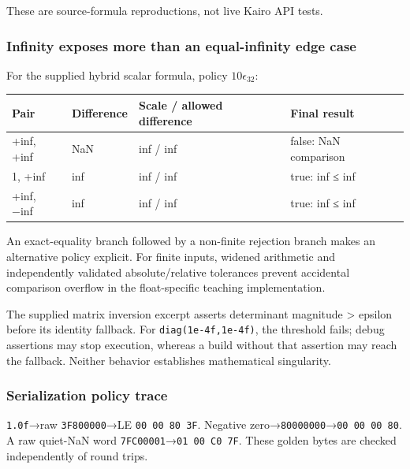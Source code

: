 These are source-formula reproductions, not live Kairo API tests.

\subsubsection{Infinity exposes more than an equal-infinity edge case}\label{appendix-92ff77d4dfdc-infinity-exposes-more-than-an-equal-infinity-edge-case}

\hypertarget{appendix-92ff77d4dfdc-infinity-exposes-more-than-an-equal-infinity-edge-case}{}

For the supplied hybrid scalar formula, policy \(10\epsilon_{32}\):

{\def\LTcaptype{none} %
\begin{longtable}[]{@{}llll@{}}
\toprule\noalign{}
Pair & Difference & Scale / allowed difference & Final result \\
\midrule\noalign{}
\endhead
\bottomrule\noalign{}
\endlastfoot
+inf, +inf & NaN & inf / inf & false: NaN comparison \\
1, +inf & inf & inf / inf & true: inf ≤ inf \\
+inf, −inf & inf & inf / inf & true: inf ≤ inf \\
\end{longtable}
}

An exact-equality branch followed by a non-finite rejection branch makes an alternative policy explicit. For finite inputs, widened arithmetic and independently validated absolute/relative tolerances prevent accidental comparison overflow in the float-specific teaching implementation.

The supplied matrix inversion excerpt asserts determinant magnitude \textgreater{} epsilon before its identity fallback. For \texttt{diag(1e-4f,1e-4f)}, the threshold fails; debug assertions may stop execution, whereas a build without that assertion may reach the fallback. Neither behavior establishes mathematical singularity.

\subsubsection{Serialization policy trace}\label{appendix-92ff77d4dfdc-serialization-policy-trace}

\hypertarget{appendix-92ff77d4dfdc-serialization-policy-trace}{}

\texttt{1.0f}→raw \texttt{3F800000}→LE \texttt{00\ 00\ 80\ 3F}. Negative zero→\texttt{80000000}→\texttt{00\ 00\ 00\ 80}. A raw quiet-NaN word \texttt{7FC00001}→\texttt{01\ 00\ C0\ 7F}. These golden bytes are checked independently of round trips.

